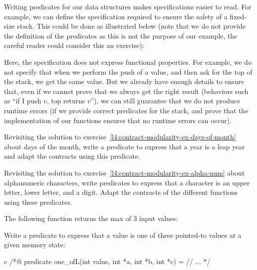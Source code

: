 Writing predicates for our data structures makes specifications easier
to read. For example, we can
define the specification required to ensure the safety of a fixed-size
stack. This could be done as illustrated below (note that we do not
provide the definition of the predicates as this is not the purpose of
our example, the careful reader could consider this an exercise):






Here, the specification does not express functional properties. For
example, we do not specify that when we perform the push of a value, and
then ask for the top of the stack, we get the same value. But we
already have enough details to ensure that, even if we cannot prove that
we always get the right result (behaviors such as ``if I push \(v\), top
returns \(v\)''), we can still guarantee that we do not produce runtime
errors (if we provide correct predicates for the stack, and prove
that the implementation of our functions ensures that no runtime errors
can occur).






Revisiting the solution to
exercise~\ref{l4:contract-modularity-ex-days-of-month} about days of the month,
write a predicate to express that a year is a leap year and adapt the contracts
using this predicate.






Revisiting the solution to
exercise~\ref{l4:contract-modularity-ex-alpha-num} about alphanumeric
characters, write predicates to express that a character is an upper letter,
lower letter, and a digit. Adapt the contracts of the different functions using
these predicates.






The following function returns the max of 3 input values:




Write a predicate to express that a value is one of three pointed-to values at a
given memory state:

\begin{CodeBlock}{c}
/*@
  predicate one_of{L}(int value, int *a, int *b, int *c) =
    // ...
*/
\end{CodeBlock}

